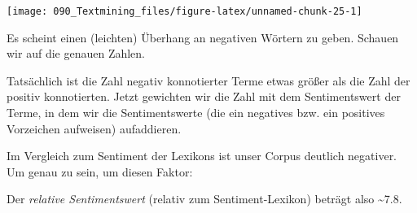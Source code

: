 \documentclass[12pt,]{book}
\newenvironment{Shaded}{\begin{snugshade}}{\end{snugshade}}
\newcommand{\KeywordTok}[1]{\textcolor[rgb]{0.13,0.29,0.53}{\textbf{{#1}}}}
\newcommand{\DataTypeTok}[1]{\textcolor[rgb]{0.13,0.29,0.53}{{#1}}}
\newcommand{\StringTok}[1]{\textcolor[rgb]{0.31,0.60,0.02}{{#1}}}
\newcommand{\CommentTok}[1]{\textcolor[rgb]{0.56,0.35,0.01}{\textit{{#1}}}}
\newcommand{\NormalTok}[1]{{#1}}
\begin{document}
\begin{center}\texttt{[image: 090\_Textmining\_files/figure-latex/unnamed-chunk-25-1]} \end{center}

Es scheint einen (leichten) Überhang an negativen Wörtern zu geben.
Schauen wir auf die genauen Zahlen.

\begin{Shaded}
\end{Shaded}

Tatsächlich ist die Zahl negativ konnotierter Terme etwas größer als die
Zahl der positiv konnotierten. Jetzt gewichten wir die Zahl mit dem
Sentimentswert der Terme, in dem wir die Sentimentswerte (die ein
negatives bzw. ein positives Vorzeichen aufweisen) aufaddieren.

\begin{Shaded}
\end{Shaded}

Im Vergleich zum Sentiment der Lexikons ist unser Corpus deutlich
negativer. Um genau zu sein, um diesen Faktor:

\begin{Shaded}
\end{Shaded}

Der \emph{relative Sentimentswert} (relativ zum Sentiment-Lexikon)
beträgt also \textasciitilde{}7.8.
\end{document}
